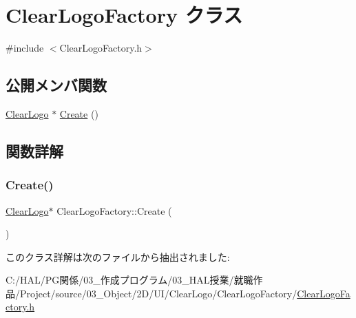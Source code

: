 \hypertarget{class_clear_logo_factory}{}\section{Clear\+Logo\+Factory クラス}
\label{class_clear_logo_factory}


{\ttfamily \#include $<$Clear\+Logo\+Factory.\+h$>$}

\subsection*{公開メンバ関数}
\begin{DoxyCompactItemize}
\item 
\mbox{\hyperlink{class_clear_logo}{Clear\+Logo}} $\ast$ \mbox{\hyperlink{class_clear_logo_factory_a98ea5747e5605f30d58be670ad4cac4a}{Create}} ()
\end{DoxyCompactItemize}


\subsection{関数詳解}
\mbox{\label{class_clear_logo_factory_a98ea5747e5605f30d58be670ad4cac4a}} 
\subsubsection{\texorpdfstring{Create()}{Create()}}
{\footnotesize\ttfamily \mbox{\hyperlink{class_clear_logo}{Clear\+Logo}}$\ast$ Clear\+Logo\+Factory\+::\+Create (\begin{DoxyParamCaption}{ }\end{DoxyParamCaption})\hspace{0.3cm}{\ttfamily [inline]}}



このクラス詳解は次のファイルから抽出されました\+:\begin{DoxyCompactItemize}
\item 
C\+:/\+H\+A\+L/\+P\+G関係/03\+\_\+作成プログラム/03\+\_\+\+H\+A\+L授業/就職作品/\+Project/source/03\+\_\+\+Object/2\+D/\+U\+I/\+Clear\+Logo/\+Clear\+Logo\+Factory/\mbox{\hyperlink{_clear_logo_factory_8h}{Clear\+Logo\+Factory.\+h}}\end{DoxyCompactItemize}
